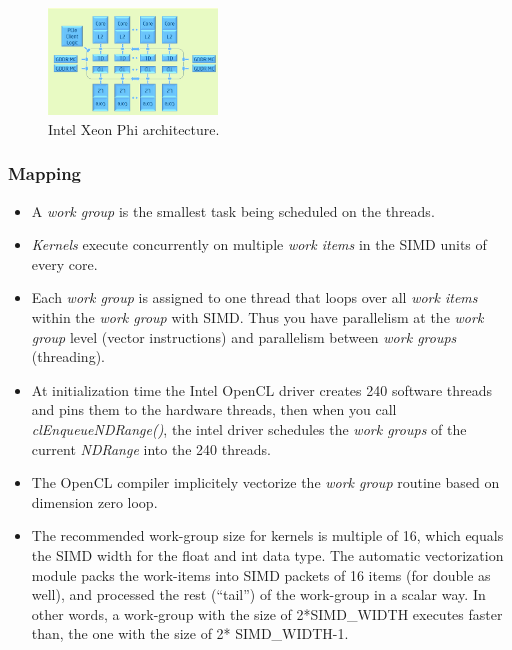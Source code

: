 \begin{figure}[!h]
    \centering
    \includegraphics[width=0.4\textwidth]{figures/phi_arch.png}
    \caption{Intel Xeon Phi architecture\cite{opencl_phi}.}
    \label{PhiArch}
\end{figure}

\subsubsection{Mapping}
\begin{itemize}
    \item A \emph{work group} is the smallest task being scheduled on the threads\cite{opencl_phi}.
    \item \emph{Kernels} execute concurrently on multiple \emph{work items} in the SIMD units of every core\cite{opencl_phi_opt}.
    \item Each \emph{work group} is assigned to one thread that loops over all \emph{work items} within the \emph{work group} 
        with SIMD. Thus you have parallelism at the \emph{work group} level (vector instructions) and parallelism between 
        \emph{work groups} (threading)\cite{opencl_phi_opt}.
    \item At initialization time the Intel OpenCL driver creates 240 software threads and pins them to the hardware threads, then
        when you call \emph{clEnqueueNDRange()}, the intel driver schedules the \emph{work groups} of the current \emph{NDRange}
        into the 240 threads\cite{opencl_phi}.
    \item The OpenCL compiler implicitely vectorize the \emph{work group} routine based on dimension zero loop.
    \item The recommended work-group size for kernels is multiple of 16, which equals the SIMD width for the float and int data 
        type. The automatic vectorization module packs the work-items into SIMD packets of 16 items (for double as well), and 
        processed the rest (“tail”) of the work-group in a scalar way. In other words, a work-group with the size of 2*SIMD\_WIDTH 
        executes faster than, the one with the size of 2* SIMD\_WIDTH-1\cite{opencl_phi_opt,opencl_phi}.

\end{itemize}

